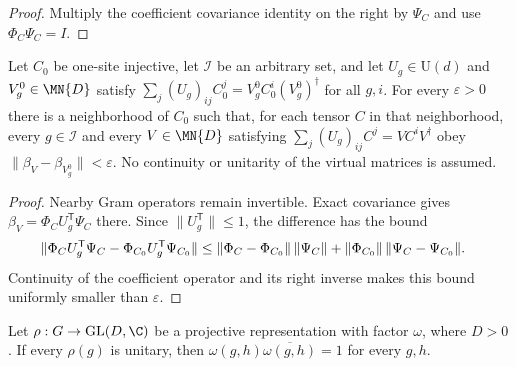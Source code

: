 \begin{proof}\leanok
    Multiply the coefficient covariance identity on the right by
    $\Psi_C$ and use $\Phi_C\Psi_C=I$.
\end{proof}

\begin{lemma}
    \label{thm:spc_aux_uniform_adjoint_estimate}
    \leanok
    Let $C_0$ be one-site injective, let $\mathcal I$ be an arbitrary set,
    and let $U_g\in\mathrm U(d)$ and $V_g^0\in\MN{D}$ satisfy
    $\sum_j(U_g)_{ij}C_0^j=V_g^0C_0^i(V_g^0)^\dagger$ for all $g,i$.
    For every $\varepsilon>0$ there is a neighborhood of $C_0$ such that,
    for each tensor $C$ in that neighborhood, every $g\in\mathcal I$ and
    every $V\in\MN{D}$ satisfying
    $\sum_j(U_g)_{ij}C^j=VC^iV^\dagger$ obey
    $\|\beta_V-\beta_{V_g^0}\|<\varepsilon$.
    No continuity or unitarity of the virtual matrices is assumed.
\end{lemma}

\begin{proof}\leanok
    Nearby Gram operators remain invertible. Exact covariance gives
    $\beta_V=\Phi_CU_g^{\mathsf T}\Psi_C$ there. Since
    $\|U_g^{\mathsf T}\|\leq1$, the difference has the bound
    \begin{align}
        \|\Phi_CU_g^{\mathsf T}\Psi_C-
        \Phi_{C_0}U_g^{\mathsf T}\Psi_{C_0}\|
         & \leq \|\Phi_C-\Phi_{C_0}\|\,\|\Psi_C\|
        +\|\Phi_{C_0}\|\,\|\Psi_C-\Psi_{C_0}\|.\notag
    \end{align}
    Continuity of the coefficient operator and its right inverse makes
    this bound uniformly smaller than $\varepsilon$.
\end{proof}

\begin{lemma}
    \label{thm:spc_aux_unitary_factor_cancel}
    \leanok
    Let $\rho:G\to\mathrm{GL}(D,\C)$ be a projective representation
    with factor $\omega$, where $D>0$. If every $\rho(g)$ is unitary,
    then $\omega(g,h)\overline{\omega(g,h)}=1$ for every $g,h$.
\end{lemma}

